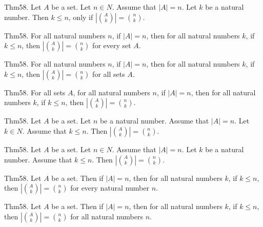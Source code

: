 \documentclass{article}
\begin{document}
Thm58. Let $A$ be a set. Let $n \in N$. Assume that $| A | = n$. Let $k$ be a natural number. Then $k \leq n$, only if $| \binom{ A }{ k}| = \binom{ n }{ k}$.

Thm58. For all natural numbers $n$, if $| A | = n$, then for all natural numbers $k$, if $k \leq n$, then $| \binom{ A }{ k}| = \binom{ n }{ k}$ for every set $A$.

Thm58. For all natural numbers $n$, if $| A | = n$, then for all natural numbers $k$, if $k \leq n$, then $| \binom{ A }{ k}| = \binom{ n }{ k}$ for all sets $A$.

Thm58. For all sets $A$, for all natural numbers $n$, if $| A | = n$, then for all natural numbers $k$, if $k \leq n$, then $| \binom{ A }{ k}| = \binom{ n }{ k}$.

Thm58. Let $A$ be a set. Let $n$ be a natural number. Assume that $| A | = n$. Let $k \in N$. Assume that $k \leq n$. Then $| \binom{ A }{ k}| = \binom{ n }{ k}$.

Thm58. Let $A$ be a set. Let $n \in N$. Assume that $| A | = n$. Let $k$ be a natural number. Assume that $k \leq n$. Then $| \binom{ A }{ k}| = \binom{ n }{ k}$.

Thm58. Let $A$ be a set. Then if $| A | = n$, then for all natural numbers $k$, if $k \leq n$, then $| \binom{ A }{ k}| = \binom{ n }{ k}$ for every natural number $n$.

Thm58. Let $A$ be a set. Then if $| A | = n$, then for all natural numbers $k$, if $k \leq n$, then $| \binom{ A }{ k}| = \binom{ n }{ k}$ for all natural numbers $n$.
\end{document}
